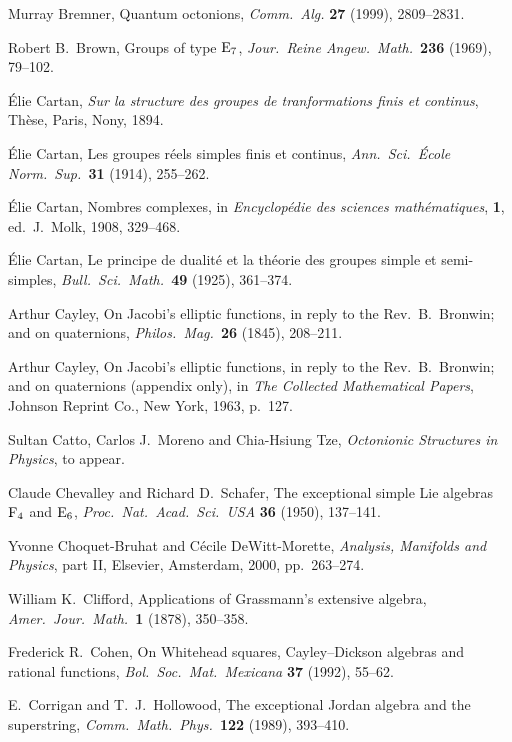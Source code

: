 \begin{thebibliography}{10}
 Murray Bremner, Quantum octonions, 
{\sl Comm.\ Alg.} {\bf 27} (1999), 2809--2831.

 Robert B.\ Brown, Groups of type ${\rm E}_7$, {\sl
Jour.\ Reine Angew.\ Math.\ }{\bf 236} (1969), 79--102.

 \'Elie Cartan, {\sl Sur la structure des groupes
de tranformations finis et continus}, Th\`ese, Paris, Nony, 1894.

 \'Elie Cartan, Les groupes r\'eels simples finis et 
continus, {\sl Ann.\ Sci.\ \'Ecole Norm.\ Sup.\ }{\bf 31} (1914),  
255--262. 

 \'Elie Cartan, Nombres complexes, in {\sl 
Encyclop\'edie des sciences math\'ematiques}, {\bf 1}, ed.\ J.\ Molk, 
1908, 329--468.  

 \'Elie Cartan, Le principe de dualit\'e et la
th\'eorie des groupes simple et semi-simples, {\sl Bull.\ Sci.\ 
Math.\ }{\bf 49} (1925), 361--374.

 Arthur Cayley, On Jacobi's elliptic functions,
in reply to the Rev.\ B.\ Bronwin; and on quaternions, {\sl Philos.\
Mag.\ }{\bf 26} (1845), 208--211.  

 Arthur Cayley, On Jacobi's elliptic functions, in
reply to the Rev.\ B.\ Bronwin; and on quaternions (appendix only), in
{\sl The Collected Mathematical Papers}, Johnson Reprint Co., New York,
1963, p.\ 127.

 Sultan Catto, Carlos J.\ Moreno and Chia-Hsiung Tze,   
{\sl Octonionic Structures in Physics}, to appear.     
   
 Claude Chevalley and Richard D.\ Schafer, The exceptional    
simple Lie algebras ${\rm F}_4$ and ${\rm E}_6$, {\sl Proc.\ Nat.\ Acad.\ Sci.\ USA}   
{\bf 36} (1950), 137--141.    
 
 Yvonne Choquet-Bruhat and C\'ecile DeWitt-Morette,  
{\sl Analysis, Manifolds and Physics}, part II, Elsevier, Amsterdam, 
2000, pp.\ 263--274. 
 
 William K.\ Clifford, Applications of Grassmann's  
extensive algebra, {\sl Amer.\ Jour.\ Math.\ }{\bf 1} (1878), 350--358.  
   
\bibitem{Cohen} Frederick R.\ Cohen, On Whitehead squares, Cayley--Dickson    
algebras and rational functions, {\sl Bol.\ Soc.\ Mat.\ Mexicana}   
{\bf 37} (1992), 55--62.    

 E.\ Corrigan and T.\ J.\ Hollowood, The exceptional Jordan
algebra and the superstring, {\sl Comm.\ Math.\ Phys.\ }{\bf 122} (1989),
393--410.


\end{thebibliography}
